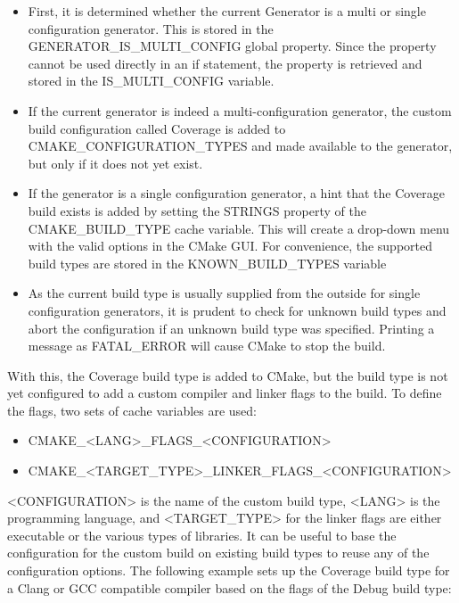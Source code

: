 \begin{itemize}
\item 
First, it is determined whether the current Generator is a multi or single configuration generator. This is stored in the GENERATOR\_IS\_MULTI\_CONFIG global property. Since the property cannot be used directly in an if statement, the property is retrieved and stored in the IS\_MULTI\_CONFIG variable.

\item 
If the current generator is indeed a multi-configuration generator, the custom build configuration called Coverage is added to CMAKE\_CONFIGURATION\_TYPES and made available to the generator, but only if it does not yet exist.

\item 
If the generator is a single configuration generator, a hint that the Coverage build exists is added by setting the STRINGS property of the CMAKE\_BUILD\_TYPE cache variable. This will create a drop-down menu with the valid options in the CMake GUI. For convenience, the supported build types are stored in the KNOWN\_BUILD\_TYPES variable

\item 
As the current build type is usually supplied from the outside for single configuration generators, it is prudent to check for unknown build types and abort the configuration if an unknown build type was specified. Printing a message as FATAL\_ERROR will cause CMake to stop the build.
\end{itemize}

With this, the Coverage build type is added to CMake, but the build type is not yet configured to add a custom compiler and linker flags to the build. To define the flags, two sets of cache variables are used:

\begin{itemize}
\item 
CMAKE\_<LANG>\_FLAGS\_<CONFIGURATION>

\item 
CMAKE\_<TARGET\_TYPE>\_LINKER\_FLAGS\_<CONFIGURATION>
\end{itemize}

<CONFIGURATION> is the name of the custom build type, <LANG> is the programming language, and <TARGET\_TYPE> for the linker flags are either executable or the various types of libraries. It can be useful to base the configuration for the custom build on existing build types to reuse any of the configuration options. The following example sets up the Coverage build type for a Clang or GCC compatible compiler based on the flags of the Debug build type:

